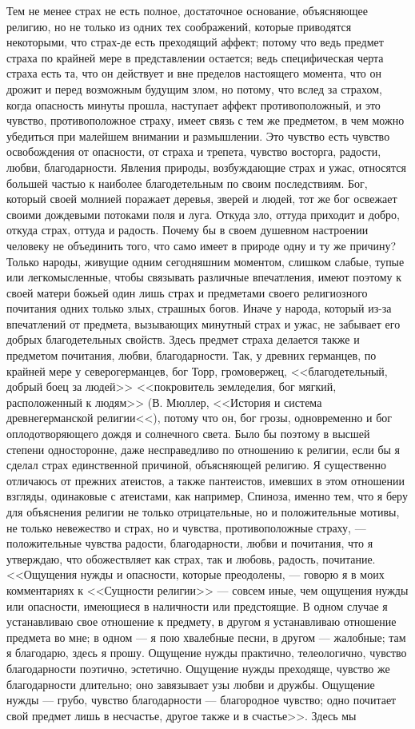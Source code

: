 \documentclass[12pt]{article}
\begin{document}
Тем не менее страх не есть полное, достаточное основание, объясняющее религию, но не только из одних тех соображений, которые приводятся некоторыми, что страх-де есть преходящий аффект; потому что ведь предмет страха по крайней мере в представлении остается; ведь специфическая черта страха есть та, что он действует и вне пределов настоящего момента, что он дрожит и перед возможным будущим злом, но потому, что вслед за страхом, когда опасность минуты прошла, наступает аффект противоположный, и это чувство, противоположное страху, имеет связь с тем же предметом, в чем можно убедиться при малейшем внимании и размышлении. Это чувство есть чувство освобождения от опасности, от страха и трепета, чувство восторга, радости, любви, благодарности. Явления природы, возбуждающие страх и ужас, относятся большей частью к наиболее благодетельным по своим последствиям. Бог, который своей молнией поражает деревья, зверей и людей, тот же бог освежает своими дождевыми потоками поля и луга. Откуда зло, оттуда приходит и добро, откуда страх, оттуда и радость. Почему бы в своем душевном настроении человеку не объединить того, что само имеет в природе одну и ту же причину? Только народы, живущие одним сегодняшним моментом, слишком слабые, тупые или легкомысленные, чтобы связывать различные впечатления, имеют поэтому к своей матери божьей один лишь страх и предметами своего религиозного почитания одних только злых, страшных богов. Иначе у народа, который из-за впечатлений от предмета, вызывающих минутный страх и ужас, не забывает его добрых благодетельных свойств. Здесь предмет страха делается также и предметом почитания, любви, благодарности. Так, у древних германцев, по крайней мере у северогерманцев, бог Торр, громовержец, <<благодетельный, добрый боец за людей>>  <<покровитель земледелия, бог мягкий, расположенный к людям>> (В. Мюллер, <<История и система древнегерманской религии<<), потому что он, бог грозы, одновременно и бог оплодотворяющего дождя и солнечного света. Было бы поэтому в высшей степени односторонне, даже несправедливо по отношению к религии, если бы я сделал страх единственной причиной, объясняющей религию. Я существенно отличаюсь от прежних атеистов, а также пантеистов, имевших в этом отношении взгляды, одинаковые с атеистами, как например, Спиноза, именно тем, что я беру для объяснения религии не только отрицательные, но и положительные мотивы, не только невежество и страх, но и чувства, противоположные страху, --- положительные чувства радости, благодарности, любви и почитания, что я утверждаю, что обожествляет как страх, так и любовь, радость, почитание. <<Ощущения нужды и опасности, которые преодолены, --- говорю я в моих комментариях к <<Сущности религии>>  --- совсем иные, чем ощущения нужды или опасности, имеющиеся в наличности или предстоящие. В одном случае я устанавливаю свое отношение к предмету, в другом я устанавливаю отношение предмета во мне; в одном --- я пою хвалебные песни, в другом --- жалобные; там я благодарю, здесь я прошу. Ощущение нужды практично, телеологично, чувство благодарности поэтично, эстетично. Ощущение нужды преходяще, чувство же благодарности длительно; оно завязывает узы любви и дружбы. Ощущение нужды --- грубо, чувство благодарности --- благородное чувство; одно почитает свой предмет лишь в несчастье, другое также и в счастье>>. Здесь мы 
\end{document}
